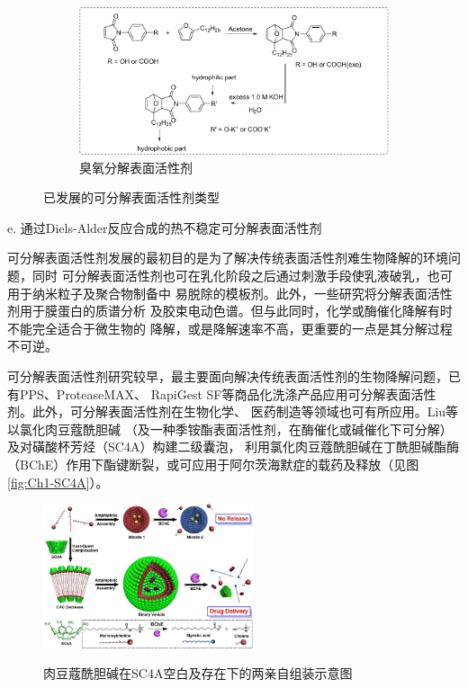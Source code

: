 \documentclass[bachelor,winfonts]{jnuthesis} %
\begin{document}
\addtocounter{figure}{-1} %
\begin{figure}[t]
\addtocounter{subfigure}{1} %
        \begin{subfigure}[b]{\textwidth}
            \centering
            \includegraphics[width=\textwidth]{Figure/cleavable-e.pdf}
            \caption{臭氧分解表面活性剂}\label{fig:cleavable-e}
        \end{subfigure}
        \caption{已发展的可分解表面活性剂类型}\label{fig:cleavable-saa}
    \end{figure}
    e. 通过Diels-Alder反应合成的热不稳定可分解表面活性剂
    
    可分解表面活性剂发展的最初目的是为了解决传统表面活性剂难生物降解的环境问题，同时
    可分解表面活性剂也可在乳化阶段之后通过刺激手段使乳液破乳，也可用于纳米粒子及聚合物制备中
    易脱除的模板剂\cite{liu2007}。此外，一些研究将分解表面活性剂用于膜蛋白的质谱分析\cite{norris2003}
    及胶束电动色谱\cite{stanley2012}。但与此同时，化学或酶催化降解有时不能完全适合于微生物的
    降解\cite{tehrani2007}，或是降解速率不高，更重要的一点是其分解过程不可逆\cite{liu2007}。
    
    可分解表面活性剂研究较早，最主要面向解决传统表面活性剂的生物降解问题，已有PPS、ProteaseMAX、
    RapiGest SF等商品化洗涤产品应用可分解表面活性剂。此外，可分解表面活性剂在生物化学、
    医药制造等领域也可有所应用\cite{hellberg2000}。Liu等\cite{guo2012}以氯化肉豆蔻酰胆碱
    （及一种季铵酯表面活性剂，在酶催化或碱催化下可分解）及对磺酸杯芳烃（SC4A）构建二级囊泡，
    利用氯化肉豆蔻酰胆碱在丁酰胆碱酯酶（BChE）作用下酯键断裂，或可应用于阿尔茨海默症的载药及释放（见图\ref{fig:Ch1-SC4A}）。
    
    \begin{figure}[htbp]
        \centering
        \includegraphics[width= 0.55\textwidth]{Figure/Ch1-SC4A}\\
        \caption{肉豆蔻酰胆碱在SC4A空白及存在下的两亲自组装示意图}\label{fig:cleavale-SC4A}
    \end{figure}
        
\end{document}
